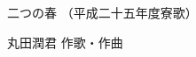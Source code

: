 \documentclass[10pt,b5j]{tarticle} %
\begin{document}
\begin{minipage}[c]{0.7\hsize} %
    \begin{center}
        {\LARGE
            二つの春 %
        }
        {\small 
            （平成二十五年度寮歌） %
        }
    \end{center}
\end{minipage}
\begin{minipage}[c]{0.3\hsize} %
    \begin{flushright} %
        丸田潤君 作歌・作曲 %
    \end{flushright}
\end{minipage}
\end{document}
